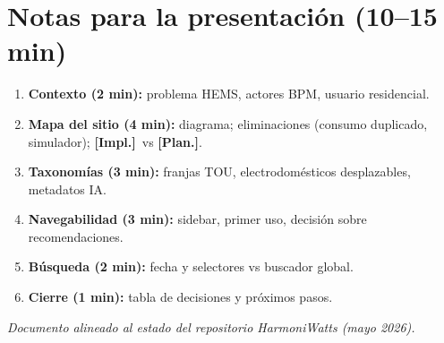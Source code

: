 \documentclass[11pt,a4paper]{article}
\newcommand{\stimpl}{\textcolor{impl}{\textbf{[Impl.]}}}
\newcommand{\stplan}{\textcolor{plan}{\textbf{[Plan.]}}}
\begin{document}
\section{Notas para la presentación (10--15 min)}

\begin{enumerate}[leftmargin=*]
  \item \textbf{Contexto (2 min):} problema HEMS, actores BPM, usuario residencial.
  \item \textbf{Mapa del sitio (4 min):} diagrama; eliminaciones (consumo duplicado, simulador); \stimpl\ vs \stplan.
  \item \textbf{Taxonomías (3 min):} franjas TOU, electrodomésticos desplazables, metadatos IA.
  \item \textbf{Navegabilidad (3 min):} sidebar, primer uso, decisión sobre recomendaciones.
  \item \textbf{Búsqueda (2 min):} fecha y selectores vs buscador global.
  \item \textbf{Cierre (1 min):} tabla de decisiones y próximos pasos.
\end{enumerate}

\vspace{1em}
\noindent\small\textit{Documento alineado al estado del repositorio HarmoniWatts (mayo 2026).}
\end{document}
